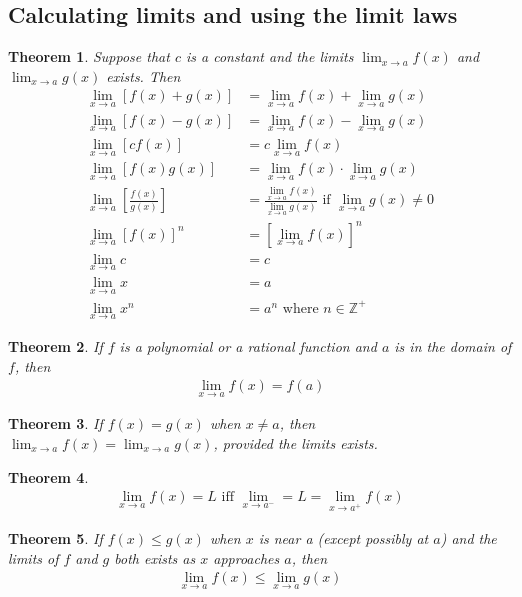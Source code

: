 \documentclass{article}
\theoremstyle{sltheorem}
\newtheorem{theorem}{Theorem}[section]
\begin{document}
\subsection{Calculating limits and using the limit laws}
\begin{theorem}
    Suppose that $c$ is a constant and the limits $\lim_{x\to a}f(x)$ and $\lim_{x\to a}g(x)$ exists. Then
    \begin{align*}
        \lim_{x\to a}\left[f(x)+g(x)\right]
        &=\lim_{x\to a}f(x)+\lim_{x\to a}g(x)\\
        \lim_{x\to a}\left[f(x)-g(x)\right]
        &=\lim_{x\to a}f(x)-\lim_{x\to a}g(x)\\
        \lim_{x\to a}\left[cf(x)\right]
        &=c\lim_{x\to a}f(x)\\
        \lim_{x\to a}\left[f(x)g(x)\right]
        &=\lim_{x\to a}f(x)\cdot\lim_{x\to a}g(x)\\
        \lim_{x\to a}\left[\frac{f(x)}{g(x)}\right]
        &=\frac{\lim_{x\to a}f(x)}{\lim_{x\to a}g(x)}\text{ if } \lim_{x\to a}g(x)\not = 0\\
        \lim_{x\to a}\left[f(x)\right]^n
        &=\left[\lim_{x\to a}f(x)\right]^n\\
        \lim_{x\to a}c &= c\\
        \lim_{x \to a}x &= a\\
        \lim_{x \to a}x^n &= a^n \text{ where } n\in\mathbb{Z}^+
    \end{align*}
\end{theorem}
\begin{theorem}
    If $f$ is a polynomial or a rational function and $a$ is in the domain of $f$, then
    \begin{align*}
        \lim_{x\to a}f(x) = f(a)
    \end{align*}
\end{theorem}
\begin{theorem}
    If $f(x) = g(x)$ when $x\not=a$, then $\lim_{x\to a}f(x) = \lim_{x\to a}g(x)$, provided the limits exists.
\end{theorem}
\begin{theorem}
    \begin{align*}
        \lim_{x\to a} f(x) = L\text{ iff } \lim_{x\to a^-}=L=\lim_{x\to a^+} f(x)
    \end{align*}
\end{theorem}
\begin{theorem}
    If $f(x) \leq g(x)$ when $x$ is near a (except possibly at $a$) and the limits of $f$ and $g$ both exists as $x$ approaches $a$, then
    \begin{align*}
        \lim_{x\to a}f(x) \leq \lim_{x\to a} g(x)
    \end{align*}
\end{theorem}
\end{document}
